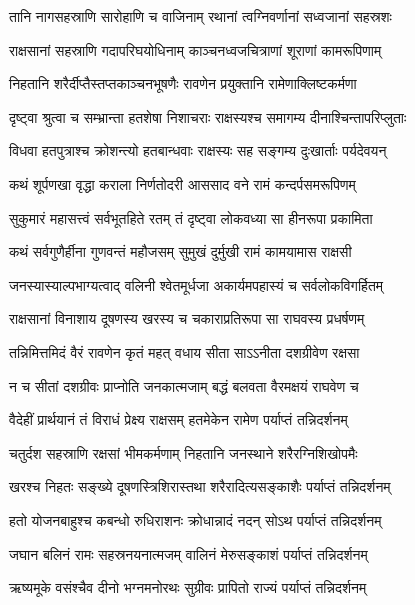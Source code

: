 
\twolineshloka
{तानि नागसहस्राणि सारोहाणि च वाजिनाम्}
{रथानां त्वग्निवर्णानां सध्वजानां सहस्रशः} %

\twolineshloka
{राक्षसानां सहस्राणि गदापरिघयोधिनाम्}
{काञ्चनध्वजचित्राणां शूराणां कामरूपिणाम्} %

\twolineshloka
{निहतानि शरैर्दीप्तैस्तप्तकाञ्चनभूषणैः}
{रावणेन प्रयुक्तानि रामेणाक्लिष्टकर्मणा} %

\twolineshloka
{दृष्ट्वा श्रुत्वा च सम्भ्रान्ता हतशेषा निशाचराः}
{राक्षस्यश्च समागम्य दीनाश्चिन्तापरिप्लुताः} %

\twolineshloka
{विधवा हतपुत्राश्च क्रोशन्त्यो हतबान्धवाः}
{राक्षस्यः सह सङ्गम्य दुःखार्ताः पर्यदेवयन्} %

\twolineshloka
{कथं शूर्पणखा वृद्धा कराला निर्णतोदरी}
{आससाद वने रामं कन्दर्पसमरूपिणम्} %

\twolineshloka
{सुकुमारं महासत्त्वं सर्वभूतहिते रतम्}
{तं दृष्ट्वा लोकवध्या सा हीनरूपा प्रकामिता} %

\twolineshloka
{कथं सर्वगुणैर्हीना गुणवन्तं महौजसम्}
{सुमुखं दुर्मुखी रामं कामयामास राक्षसी} %

\twolineshloka
{जनस्यास्याल्पभाग्यत्वाद् वलिनी श्वेतमूर्धजा}
{अकार्यमपहास्यं च सर्वलोकविगर्हितम्} %

\twolineshloka
{राक्षसानां विनाशाय दूषणस्य खरस्य च}
{चकाराप्रतिरूपा सा राघवस्य प्रधर्षणम्} %

\twolineshloka
{तन्निमित्तमिदं वैरं रावणेन कृतं महत्}
{वधाय सीता साऽऽनीता दशग्रीवेण रक्षसा} %

\twolineshloka
{न च सीतां दशग्रीवः प्राप्नोति जनकात्मजाम्}
{बद्धं बलवता वैरमक्षयं राघवेण च} %

\twolineshloka
{वैदेहीं प्रार्थयानं तं विराधं प्रेक्ष्य राक्षसम्}
{हतमेकेन रामेण पर्याप्तं तन्निदर्शनम्} %

\twolineshloka
{चतुर्दश सहस्राणि रक्षसां भीमकर्मणाम्}
{निहतानि जनस्थाने शरैरग्निशिखोपमैः} %

\twolineshloka
{खरश्च निहतः सङ्ख्ये दूषणस्त्रिशिरास्तथा}
{शरैरादित्यसङ्काशैः पर्याप्तं तन्निदर्शनम्} %

\twolineshloka
{हतो योजनबाहुश्च कबन्धो रुधिराशनः}
{क्रोधान्नादं नदन् सोऽथ पर्याप्तं तन्निदर्शनम्} %

\twolineshloka
{जघान बलिनं रामः सहस्रनयनात्मजम्}
{वालिनं मेरुसङ्काशं पर्याप्तं तन्निदर्शनम्} %

\twolineshloka
{ऋष्यमूके वसंश्चैव दीनो भग्नमनोरथः}
{सुग्रीवः प्रापितो राज्यं पर्याप्तं तन्निदर्शनम्} %

